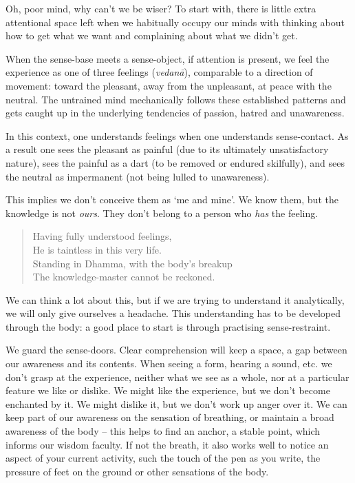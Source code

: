Oh, poor mind, why can't we be wiser? To start with, there is little
extra attentional space left when we habitually occupy our minds with
thinking about how to get what we want and complaining about what we
didn't get.

When the sense-base meets a sense-object, if attention is present, we
feel the experience as one of three feelings (\emph{vedanā}), comparable
to a direction of movement: toward the pleasant, away from the
unpleasant, at peace with the neutral. The untrained mind mechanically
follows these established patterns and gets caught up in the underlying
tendencies of passion, hatred and unawareness.

In this context, one understands feelings when one understands
sense-contact. As a result one sees the pleasant as painful (due to its
ultimately unsatisfactory nature), sees the painful as a dart (to be
removed or endured skilfully), and sees the neutral as impermanent (not
being lulled to unawareness).

This implies we don't conceive them as `me and mine'. We know them, but
the knowledge is not \emph{ours}. They don't belong to a person who
\emph{has} the feeling.

\begin{quote}
Having fully understood feelings,\\
He is taintless in this very life.\\
Standing in Dhamma, with the body's breakup\\
The knowledge-master cannot be reckoned.

\bigskip

\end{quote}


We can think a lot about this, but if we are trying to understand it
analytically, we will only give ourselves a headache. This understanding
has to be developed through the body: a good place to start is through
practising sense-restraint.

We guard the sense-doors. Clear comprehension will keep a space, a gap
between our awareness and its contents. When seeing a form, hearing a
sound, etc. we don't grasp at the experience, neither what we see as a
whole, nor at a particular feature we like or dislike. We might like the
experience, but we don't become enchanted by it. We might dislike it,
but we don't work up anger over it. We can keep part of our awareness on
the sensation of breathing, or maintain a broad awareness of the body --
this helps to find an anchor, a stable point, which informs our wisdom
faculty. If not the breath, it also works well to notice an aspect of
your current activity, such the touch of the pen as you write, the
pressure of feet on the ground or other sensations of the body.

